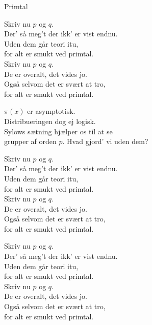 \begin{song}{Primtal}
  \begin{SBChorus}
    Skriv nu $p$ og $q$.\\
    Der’ så meg’t der ikk’ er vist endnu.\\
    Uden dem går teori itu,\\
    for alt er smukt ved primtal.\\
    Skriv nu $p$ og $q$.\\
    De er overalt, det vides jo.\\
    Også selvom det er svært at tro,\\
    for alt er smukt ved primtal.
  \end{SBChorus}


  \begin{SBVerse}
    $\pi(x)$ er asymptotisk.\\
    Distribueringen dog ej logisk.\\
    Sylows sætning hjælper os til at se\\
    grupper af orden $p$. Hvad gjord’ vi uden dem?\\
  \end{SBVerse}

  \begin{SBChorus}
    Skriv nu $p$ og $q$.\\
    Der’ så meg’t der ikk’ er vist endnu.\\
    Uden dem går teori itu,\\
    for alt er smukt ved primtal.\\
    Skriv nu $p$ og $q$.\\
    De er overalt, det vides jo.\\
    Også selvom det er svært at tro,\\
    for alt er smukt ved primtal.
  \end{SBChorus}

  \begin{SBChorus}
    Skriv nu $p$ og $q$.\\
    Der’ så meg’t der ikk’ er vist endnu.\\
    Uden dem går teori itu,\\
    for alt er smukt ved primtal.\\
    Skriv nu $p$ og $q$.\\
    De er overalt, det vides jo.\\
    Også selvom det er svært at tro,\\
    for alt er smukt ved primtal.
  \end{SBChorus}


\end{song}